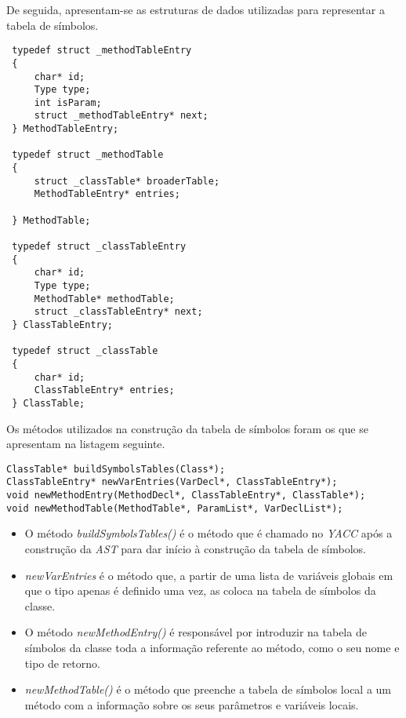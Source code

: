 \documentclass[11pt,a4paper]{article}
\begin{document}
De seguida, apresentam-se as estruturas de dados utilizadas para representar a tabela de símbolos.

\begin{lstlisting}
 typedef struct _methodTableEntry
 {
     char* id;
     Type type;
     int isParam;
     struct _methodTableEntry* next;
 } MethodTableEntry;

 typedef struct _methodTable
 {
     struct _classTable* broaderTable;
     MethodTableEntry* entries;

 } MethodTable;

 typedef struct _classTableEntry
 {
     char* id;
     Type type;
     MethodTable* methodTable;
     struct _classTableEntry* next;
 } ClassTableEntry;

 typedef struct _classTable
 {
     char* id;
     ClassTableEntry* entries;
 } ClassTable;
\end{lstlisting}

Os métodos utilizados na construção da tabela de símbolos foram os que se apresentam na listagem seguinte.

\begin{lstlisting}
ClassTable* buildSymbolsTables(Class*);
ClassTableEntry* newVarEntries(VarDecl*, ClassTableEntry*);
void newMethodEntry(MethodDecl*, ClassTableEntry*, ClassTable*);
void newMethodTable(MethodTable*, ParamList*, VarDeclList*);
\end{lstlisting}

\begin{itemize}
    \item O método \textit{buildSymbolsTables()} é o método que é chamado no \textit{YACC} após a construção da \textit{AST} para dar início à construção da tabela de símbolos.
    \item \textit{newVarEntries} é o método que, a partir de uma lista de variáveis globais em que o tipo apenas é definido uma vez, as coloca na tabela de símbolos da classe.
    \item O método \textit{newMethodEntry()} é responsável por introduzir na tabela de símbolos da classe toda a informação referente ao método, como o seu nome e tipo de retorno.
    \item \textit{newMethodTable()} é o método que preenche a tabela de símbolos local a um método com a informação sobre os seus parâmetros e variáveis locais.
\end{itemize}
\end{document}
